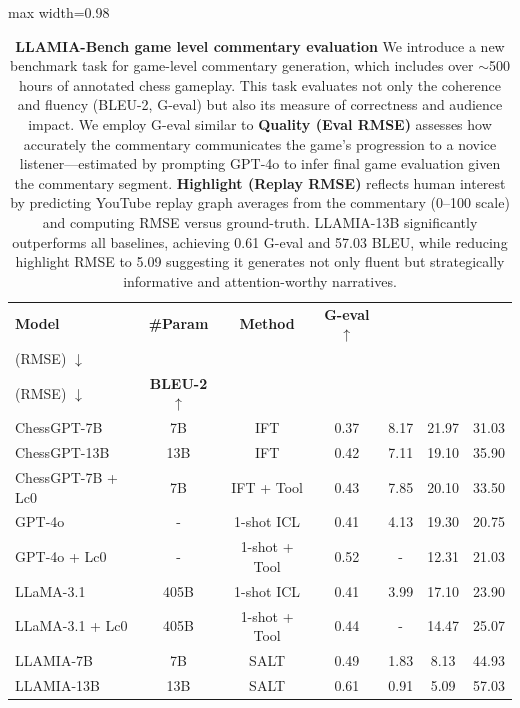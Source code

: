 \documentclass{article}
\newcommand{\valbest}[1]{\colorbox{valbest}{#1}}
\newcommand{\valgood}[1]{\colorbox{valgood}{#1}}
\theoremstyle{plain}
\theoremstyle{definition}
\theoremstyle{remark}
\begin{document}
\begin{table}[!h]
    \centering
    \begin{adjustbox}{max width=0.98\textwidth}
    \begin{tabular}{lcc|cccc}
    \toprule[1.2pt]
    \textbf{Model} & \textbf{\#Param} & \textbf{Method} & \textbf{G-eval $\uparrow$} & \makecell{\textbf{Quality}\\(RMSE) $\downarrow$} & \makecell{\textbf{Highlight}\\(RMSE) $\downarrow$} & \textbf{BLEU-2 $\uparrow$} \\
    \midrule
    ChessGPT-7B & 7B & IFT & 0.37 & 8.17 & 21.97 & 31.03 \\
    ChessGPT-13B & 13B & IFT & 0.42 & 7.11 & 19.10 & 35.90 \\
    ChessGPT-7B + Lc0 & 7B & IFT + Tool & 0.43 & 7.85 & 20.10 & 33.50 \\
    \midrule
    GPT-4o & - & 1-shot ICL & 0.41 & 4.13 & 19.30 & 20.75 \\
    GPT-4o + Lc0 & - & 1-shot + Tool & \valgood{0.52} & - & 12.31 & 21.03 \\
    LLaMA-3.1 & 405B & 1-shot ICL & 0.41 & 3.99 & 17.10 & 23.90 \\
    LLaMA-3.1 + Lc0 & 405B & 1-shot + Tool & 0.44 & - & 14.47 & 25.07 \\
    \midrule
    LLAMIA-7B & 7B & SALT & 0.49 & \valgood{1.83} & \valgood{8.13} & \valgood{44.93} \\
    LLAMIA-13B & 13B & SALT & \valbest{0.61} & \valbest{0.91} & \valbest{5.09} & \valbest{57.03} \\
    \bottomrule[1.2pt]
    \end{tabular}
    \end{adjustbox}
    \caption{
    \textbf{LLAMIA-Bench game level commentary evaluation}  
    We introduce a new benchmark task for game-level commentary generation, which includes over \(\sim\)500 hours of annotated chess gameplay. This task evaluates not only the coherence and fluency (BLEU-2, G-eval\cite{liu2023g}) but also its measure of correctness and audience impact. We employ G-eval similar to \cite{kim2024bridging}
    \textbf{Quality (Eval RMSE)} assesses how accurately the commentary communicates the game’s progression to a novice listener—estimated by prompting GPT-4o to infer final game evaluation given the commentary segment.  
    \textbf{Highlight (Replay RMSE)} reflects human interest by predicting YouTube replay graph averages from the commentary (0–100 scale) and computing RMSE versus ground-truth.  
    LLAMIA-13B significantly outperforms all baselines, achieving 0.61 G-eval and 57.03 BLEU, while reducing highlight RMSE to 5.09 suggesting it generates not only fluent but strategically informative and attention-worthy narratives. 
    }
    \label{tab:game_commentary_annotation}
\end{table}
\end{document}
